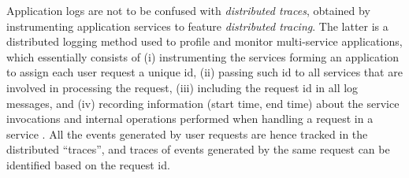 Application logs are not to be confused with \textit{distributed traces}, obtained by instrumenting application services to feature \textit{distributed tracing}.
The latter is a distributed logging method used to profile and monitor multi-service applications, which essentially consists of (i) instrumenting the services forming an application to assign each user request a unique id, (ii) passing such id to all services that are involved in processing the request, (iii) including the request id in all log messages, and (iv) recording information (\eg start time, end time) about the service invocations and internal operations performed when handling a request in a service \cite{Richardson2018_MicroservicesPatterns}.
All the events generated by user requests are hence tracked in the distributed \enquote{traces}, and traces of events generated by the same request can be identified based on the request id. 